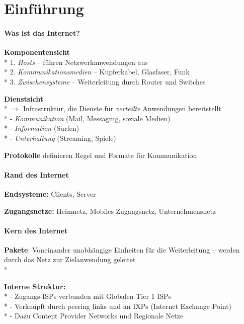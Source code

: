\section{Einführung}

\paragraph{Was ist das Internet?}
\begin{items}
  \item \textbf{Komponentensicht} \\*
    1. \emph{Hosts} -- führen Netzwerkanwendungen aus \\*
    2. \emph{Kommunikationsmedien} -- Kupferkabel, Glasfaser, Funk \\*
    3. \emph{Zwischensysteme} -- Weiterleitung durch Router und Switches
  \item \textbf{Dienstsicht} \\*
    \( \Rightarrow \) Infrastruktur, die Dienste für \emph{verteilte} Anwendungen bereitstellt \\*
    - \emph{Kommunikation} (Mail, Messaging, soziale Medien) \\*
    - \emph{Information} (Surfen) \\*
    - \emph{Unterhaltung} (Streaming, Spiele)
    \item \textbf{Protokolle} definieren Regel und Formate für Kommunikation
\end{items}

\paragraph{Rand des Internet}
\begin{items}
  \item \textbf{Endsysteme: } Clients, Server
  \item \textbf{Zugangsnetze: } Heimnetz, Mobiles Zugangsnetz, Unternehmensnetz
\end{items}

\paragraph{Kern des Internet}
\begin{items}
  \item \textbf{Pakete}: Voneinander unabhängige Einheiten für die Weiterleitung -- werden durch das Netz zur Zielanwendung geleitet\\*
  \item \textbf{Interne Struktur:}\\*
  - Zugangs-ISPs verbunden mit Globalen Tier 1 ISPs\\*
  - Verknüpft durch peering links und an IXPs (Internet Exchange Point)\\*
  - Dazu Content Provider Networks und Regionale Netze
\end{items}

